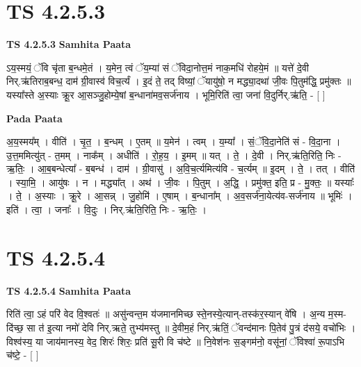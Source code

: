 \documentclass[17pt]{extarticle}
\begin{document}
\section*{ TS 4.2.5.3 }

\textbf{TS 4.2.5.3 } \newline
\textbf{Samhita Paata} \newline

ऽय॒स्मयं॒ ॅवि चृ॑ता ब॒न्धमे॒तं । य॒मेन॒ त्वं ॅय॒म्या॑ सं ॅविदा॒नोत्त॒मं नाक॒मधि॑ रोहये॒मं ॥ यत्ते॑ दे॒वी निर्.ऋ॑तिराब॒बन्ध॒ दाम॑ ग्री॒वास्व॑ विच॒र्त्यं । इ॒दं ते॒ तद् विष्यां॒ ॅयायु॑षो॒ न मद्ध्या॒दथा॑ जी॒वः पि॒तुम॑द्धि॒ प्रमु॑क्तः ॥ यस्या᳚स्ते अ॒स्याः क्रू॒र आ॒सञ्जु॒होम्ये॒षां ब॒न्धाना॑मव॒सर्ज॑नाय । भूमि॒रिति॑ त्वा॒ जना॑ वि॒दुर्निर्.ऋ॑ति॒ - [  ] \newline

\textbf{Pada Paata} \newline

अ॒य॒स्मय᳚म् । वीति॑ । चृ॒त॒ । ब॒न्धम् । ए॒तम् ॥ य॒मेन॑ । त्वम् । य॒म्या᳚ । सं॒ॅवि॒दा॒नेति॑ सं - वि॒दा॒ना । उ॒त्त॒ममित्यु॑त् - त॒मम् । नाक᳚म् । अधीति॑ । रो॒ह॒य॒ । इ॒मम् ॥ यत् । ते॒ । दे॒वी । निर्.ऋ॑ति॒रिति॒ निः - ऋ॒तिः॒ । आ॒ब॒बन्धेत्या᳚ - ब॒बन्ध॑ । दाम॑ । ग्री॒वासु॑ । अ॒वि॒च॒र्त्यमित्य॑वि - च॒र्त्यम् ॥ इ॒दम् । ते॒ । तत् । वीति॑ । स्या॒मि॒ । आयु॑षः । न । मद्ध्या᳚त् । अथ॑ । जी॒वः । पि॒तुम् । अ॒द्धि॒ । प्रमु॑क्त॒ इति॒ प्र - मु॒क्तः॒ ॥ यस्याः᳚ । ते॒ । अ॒स्याः । क्रू॒रे । आ॒सन्न् । जु॒होमि॑ । ए॒षाम् । ब॒न्धाना᳚म् । अ॒व॒सर्ज॑ना॒येत्य॑व-सर्ज॑नाय ॥ भूमिः॑ । इति॑ । त्वा॒ । जनाः᳚ । वि॒दुः । निर्.ऋ॑ति॒रिति॒ निः - ऋ॒तिः॒ ।  \newline




\section*{ TS 4.2.5.4 }

\textbf{TS 4.2.5.4 } \newline
\textbf{Samhita Paata} \newline

रिति॑ त्वा॒ ऽहं परि॑ वेद वि॒श्वतः॑ ॥ असु॑न्वन्त॒म य॑जमानमिच्छ स्ते॒नस्ये॒त्यान्-तस्क॑र॒स्यान् वे॑षि । अ॒न्य म॒स्म-दि॑च्छ॒ सा त॑ इ॒त्या नमो॑ देवि निर्.ऋते॒ तुभ्य॑मस्तु ॥ दे॒वीम॒हं निर्.ऋ॑तिं॒ ॅवन्द॑मानः पि॒तेव॑ पु॒त्रं द॑सये॒ वचो॑भिः । विश्व॑स्य॒ या जाय॑मानस्य॒ वेद॒ शिरः॑ शिरः॒ प्रति॑ सू॒री वि च॑ष्टे ॥ नि॒वेश॑नः स॒ङ्गम॑नो॒ वसू॑नां॒ ॅविश्वा॑ रू॒पाऽभि च॑ष्टे॒ - [  ] \newline
\end{document}
